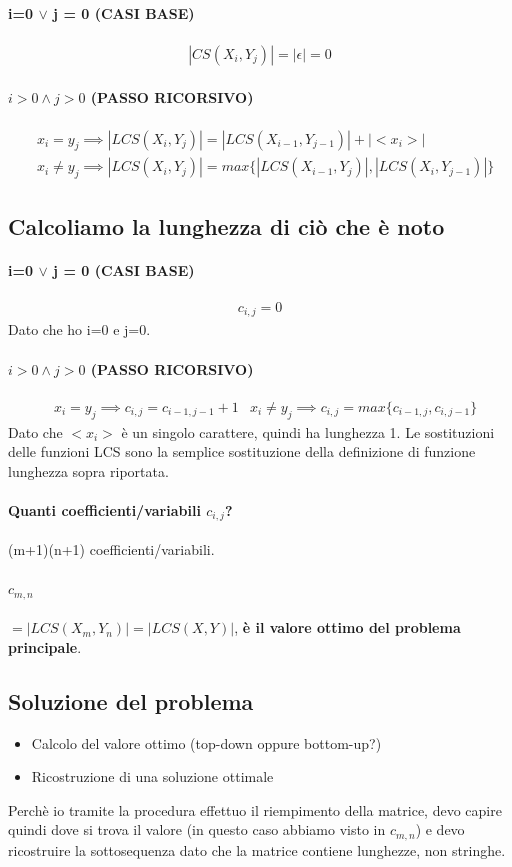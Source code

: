 \paragraph*{i=0 $\vee$ j = 0 (CASI BASE)}
\begin{align*}
    |CS(X_i, Y_j)| = |\epsilon| = 0
\end{align*}
\paragraph*{$i > 0 \wedge j>0$ (PASSO RICORSIVO)}
\begin{align*}
    &x_i = y_j \implies |LCS(X_i, Y_j)| = |LCS(X_{i-1}, Y_{j-1})| + |<x_i>|\\
    &x_i \neq y_j \implies |LCS(X_i, Y_j)| = max\{|LCS(X_{i-1}, Y_j)|, |LCS(X_i, Y_{j-1})|\}
\end{align*}
\subsection*{Calcoliamo la lunghezza di ciò che è noto}
\paragraph*{i=0 $\vee$ j = 0 (CASI BASE)}
\begin{align*}
    c_{i,j} = 0
\end{align*}
Dato che ho i=0 e j=0.
\paragraph*{$i > 0 \wedge j>0$ (PASSO RICORSIVO)}
\begin{align*}
    &x_i = y_j \implies c_{i,j} = c_{i-1,j-1} + 1
    &x_i \neq y_j \implies c_{i,j} = max\{c_{i-1,j}, c_{i,j-1}\}
\end{align*}
Dato che $<x_i>$ è un singolo carattere, quindi ha lunghezza 1. Le sostituzioni
delle funzioni LCS sono la semplice sostituzione della definizione di funzione lunghezza
sopra riportata.
\paragraph*{Quanti coefficienti/variabili $c_{i,j}$?} (m+1)(n+1) coefficienti/variabili.
\paragraph*{$c_{m,n}$} $=|LCS(X_m, Y_n)| = |LCS(X,Y)|$, 
\textbf{è il valore ottimo del problema principale}.
\subsection*{Soluzione del problema}
\begin{itemize}
    \item Calcolo del valore ottimo (top-down oppure bottom-up?)
    \item Ricostruzione di una soluzione ottimale
\end{itemize}
Perchè io tramite la procedura effettuo il riempimento della matrice, devo capire quindi dove
si trova il valore (in questo caso abbiamo visto in $c_{m,n}$) e devo ricostruire la
sottosequenza dato che la matrice contiene lunghezze, non stringhe.
